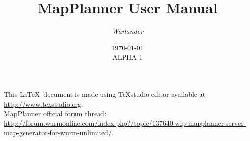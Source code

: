 \documentclass[12pt,a4paper,titlepage]{article}
\title{MapPlanner User Manual}
\author{\itshape Warlander}
\date{\today\\ALPHA 1}
\begin{document}
	\maketitle
	\pagebreak
	
	\tableofcontents
	\vfill
	This \LaTeX~document is made using \TeX studio editor available at \url{http://www.texstudio.org}.
	\\
	MapPlanner official forum thread: \url{http://forum.wurmonline.com/index.php?/topic/137640-wip-mapplanner-server-map-generator-for-wurm-unlimited/}.
	\pagebreak
	
	
	\pagebreak
	
\end{document}
